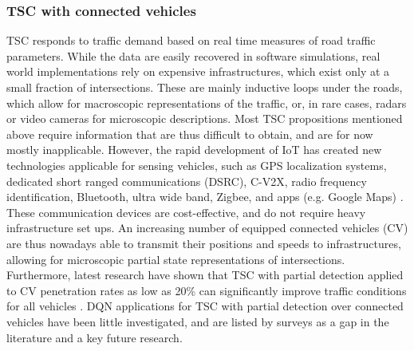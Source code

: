 \documentclass[journal]{IEEEtran}
\begin{document}
\subsubsection{TSC with connected vehicles}

TSC responds to traffic demand based on real time measures of road traffic parameters. While the data are easily recovered in software simulations, real world implementations rely on expensive infrastructures, which exist only at a small fraction of intersections. These are mainly inductive loops under the roads, which allow for macroscopic representations of the traffic, or, in rare cases, radars or video cameras for microscopic descriptions. Most TSC propositions mentioned above require information that are thus difficult to obtain, and are for now mostly inapplicable. However, the rapid  development of IoT has created new technologies applicable for sensing vehicles, such as GPS localization systems, dedicated short ranged communications (DSRC), C-V2X, radio frequency identification, Bluetooth, ultra wide band, Zigbee, and apps (e.g. Google Maps) \cite{nguyen2020estimation,zhang2020using}. These communication devices are cost-effective, and do not require heavy infrastructure set ups. An increasing number of equipped connected vehicles (CV) are thus nowadays able to transmit their positions and speeds to infrastructures, allowing for microscopic partial state representations of intersections. Furthermore, latest research have shown that TSC with partial detection applied to CV penetration rates as low as 20\% can significantly improve traffic conditions for all vehicles \cite{zhang2019partially}. DQN applications for TSC with partial detection over connected vehicles have been little investigated, and are listed by surveys as a gap in the literature and a key future research.
\end{document}
